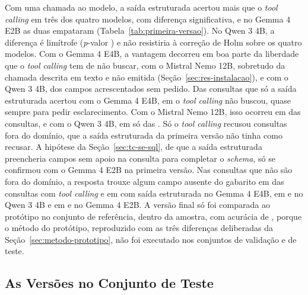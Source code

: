 Com uma chamada ao modelo, a saída estruturada acertou mais que o \textit{tool calling} em três dos quatro modelos, com diferença significativa, e no Gemma 4 E2B as duas empataram (Tabela~\ref{tab:primeira-versao}). No Qwen 3 4B, a diferença é limítrofe (\textit{p}-valor ) e não resistiria à correção de Holm sobre os quatro modelos. Com o Gemma 4 E4B, a vantagem decorreu em boa parte da liberdade que o \textit{tool calling} tem de não buscar, com o Mistral Nemo 12B, sobretudo da chamada descrita em texto e não emitida (Seção~\ref{sec:res-instalacao}), e com o Qwen 3 4B, dos campos acrescentados sem pedido. Das  consultas que só a saída estruturada acertou com o Gemma 4 E4B, em  o \textit{tool calling} não buscou, quase sempre para pedir esclarecimento. Com o Mistral Nemo 12B, isso ocorreu em  das  consultas, e com o Qwen 3 4B, em só  das . Só o \textit{tool calling} recusou consultas fora do domínio, que a saída estruturada da primeira versão não tinha como recusar. A hipótese da Seção~\ref{sec:tc-se-sql}, de que a saída estruturada preencheria campos sem apoio na consulta para completar o \textit{schema}, só se confirmou com o Gemma 4 E2B na primeira versão. Nas consultas que não são fora do domínio, a resposta trouxe algum campo ausente do gabarito em  das consultas com \textit{tool calling} e em  com saída estruturada no Gemma 4 E4B, em  e  no Qwen 3 4B e em  e  no Gemma 4 E2B. A versão final só foi comparada ao protótipo no conjunto de referência, dentro da amostra, com acurácia de , porque o método do protótipo, reproduzido com as três diferenças deliberadas da Seção~\ref{sec:metodo-prototipo}, não foi executado nos conjuntos de validação e de teste.

\subsection{As Versões no Conjunto de Teste}
\label{sec:res-versoes}

